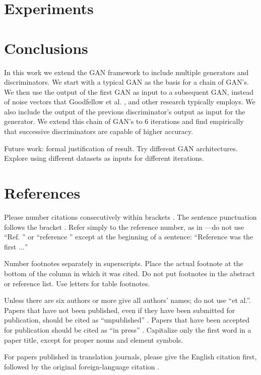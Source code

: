 \documentclass[conference]{IEEEtran}
\begin{document}
\section{Experiments}
\section{Conclusions}
In this work we extend the GAN framework to include
multiple generators and discriminators.  We start with a typical GAN as the
basis for a chain of GAN's.  We then use the output of the first GAN as 
input to a subsequent GAN, instead of noise vectors that Goodfellow et al.
\cite{gan}, and other research typically employs.  We also include the output of
the previous discriminator's output as input for the generator.  We extend this
chain of GAN's to 6 iterations and find empirically that successive discriminators 
are capable of higher accuracy.   

Future work: formal justification of result. Try different GAN architectures.
Explore using different datasets as inputs for different iterations.
\section*{References}

Please number citations consecutively within brackets \cite{b1}. The 
sentence punctuation follows the bracket \cite{b2}. Refer simply to the reference 
number, as in \cite{b3}---do not use ``Ref. \cite{b3}'' or ``reference \cite{b3}'' except at 
the beginning of a sentence: ``Reference \cite{b3} was the first $\ldots$''

Number footnotes separately in superscripts. Place the actual footnote at 
the bottom of the column in which it was cited. Do not put footnotes in the 
abstract or reference list. Use letters for table footnotes.

Unless there are six authors or more give all authors' names; do not use 
``et al.''. Papers that have not been published, even if they have been 
submitted for publication, should be cited as ``unpublished'' \cite{b4}. Papers 
that have been accepted for publication should be cited as ``in press'' \cite{b5}. 
Capitalize only the first word in a paper title, except for proper nouns and 
element symbols.

For papers published in translation journals, please give the English 
citation first, followed by the original foreign-language citation \cite{b6}.
\end{document}
